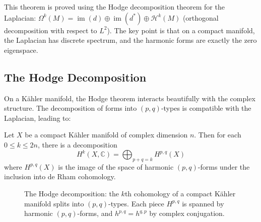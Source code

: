 This theorem is proved using the Hodge decomposition theorem for the Laplacian: $\Omega^k(M) = \operatorname{im}(d) \oplus \operatorname{im}(d^*) \oplus \mathcal{H}^k(M)$ (orthogonal decomposition with respect to $L^2$). The key point is that on a compact manifold, the Laplacian has discrete spectrum, and the harmonic forms are exactly the zero eigenspace.

\subsection{The Hodge Decomposition}

On a K\"{a}hler manifold, the Hodge theorem interacts beautifully with the complex structure. The decomposition of forms into $(p,q)$-types is compatible with the Laplacian, leading to:

\begin{theorem}
Let $X$ be a compact K\"{a}hler manifold of complex dimension $n$. Then for each $0 \le k \le 2n$, there is a decomposition
\[
H^k(X, \mathbb{C}) = \bigoplus_{p+q=k} H^{p,q}(X)
\]
where $H^{p,q}(X)$ is the image of the space of harmonic $(p,q)$-forms under the inclusion into de Rham cohomology.
\end{theorem}

\begin{figure}[htbp]
\centering
{}
\caption{The Hodge decomposition: the $k$th cohomology of a compact K\"{a}hler manifold splits into $(p,q)$-types. Each piece $H^{p,q}$ is spanned by harmonic $(p,q)$-forms, and $h^{p,q} = h^{q,p}$ by complex conjugation.}
\label{fig:hodge-decomposition}
\end{figure}

